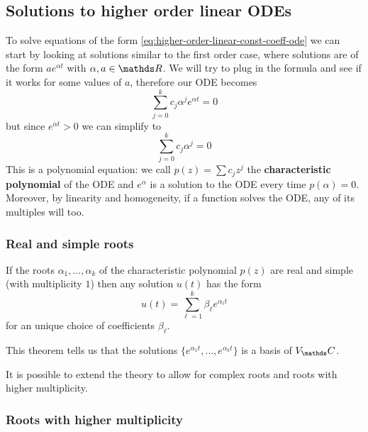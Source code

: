 \documentclass[12pt]{extarticle}
\begin{document}
\subsection{Solutions to higher order linear ODEs}

To solve equations of the form \cref{eq:higher-order-linear-const-coeff-ode} we can start by looking at solutions similar to the first order case, where solutions are of the form $a e^{\alpha t}$ with $\alpha, a \in \R$.
We will try to plug in the formula and see if it works for some values of $a$, therefore our ODE becomes
\begin{equation}
	\sum_{j = 0}^{k} c_j \alpha^j e^{\alpha t} = 0
\end{equation}
but since $e^{\alpha t} \gt 0$ we can simplify to
\begin{equation}
	\sum_{j = 0}^{k} c_j \alpha^j = 0
\end{equation}
This is a polynomial equation: we call $p(z) = \sum c_j z^j$ the \textbf{characteristic polynomial} of the ODE and $e^\alpha$ is a solution to the ODE every time $p(\alpha) = 0$.
Moreover, by linearity and homogeneity, if a function solves the ODE, any of its multiples will too.

\subsubsection{Real and simple roots}

\begin{theorem}{}{}
	If the roots $\alpha_1, \dots, \alpha_k$ of the characteristic polynomial $p(z)$ are real and simple (with multiplicity $1$) then any solution $u(t)$ has the form
	\begin{equation}
		u(t) = \sum_{\ell = 1}^{k} \beta_\ell e^{\alpha_\ell t}
	\end{equation}
	for an unique choice of coefficients $\beta_\ell$.
\end{theorem}

This theorem tells us that the solutions $\{ e^{\alpha_1 t}, \dots, e^{\alpha_k t} \}$ is a basis of $V_\C$.

It is possible to extend the theory to allow for complex roots and roots with higher multiplicity.

\subsubsection{Roots with higher multiplicity}
\end{document}

